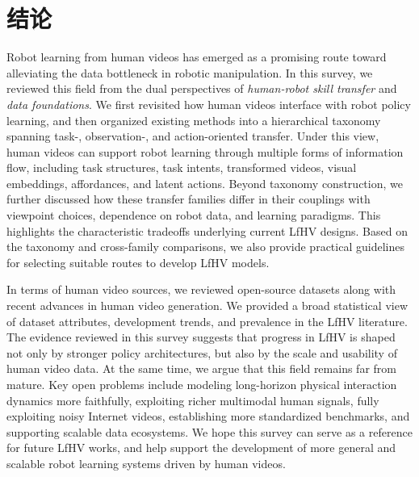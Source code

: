 \documentclass[Afour,sageh,times]{sagej}
\begin{document}
\section{结论} \label{sec:conclusion}

Robot learning from human videos has emerged as a promising route toward alleviating the data bottleneck in robotic manipulation. In this survey, we reviewed this field from the dual perspectives of \emph{human-robot skill transfer} and \emph{data foundations}. We first revisited how human videos interface with robot policy learning, and then organized existing methods into a hierarchical taxonomy spanning task-, observation-, and action-oriented transfer. Under this view, human videos can support robot learning through multiple forms of information flow, including task structures, task intents, transformed videos, visual embeddings, affordances, and latent actions. Beyond taxonomy construction, we further discussed how these transfer families differ in their couplings with viewpoint choices, dependence on robot data, and learning paradigms. This highlights the characteristic tradeoffs underlying current LfHV designs. Based on the taxonomy and cross-family comparisons, we also provide practical guidelines for selecting suitable routes to develop LfHV models.


In terms of human video sources, we reviewed open-source datasets along with recent advances in human video generation. We provided a broad statistical view of dataset attributes, development trends, and prevalence in the LfHV literature. The evidence reviewed in this survey suggests that progress in LfHV is shaped not only by stronger policy architectures, but also by the scale and usability of human video data. At the same time, we argue that this field remains far from mature. Key open problems include modeling long-horizon physical interaction dynamics more faithfully, exploiting richer multimodal human signals, fully exploiting noisy Internet videos, establishing more standardized benchmarks, and supporting scalable data ecosystems. We hope this survey can serve as a reference for future LfHV works, and help support the development of more general and scalable robot learning systems driven by human videos.





\end{document}

